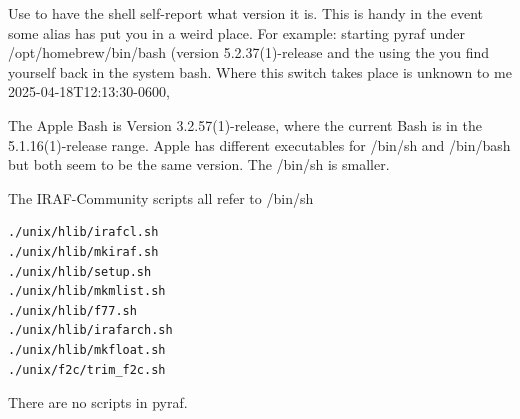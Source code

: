 Use  to have the shell self-report what version
it is. This is handy in the event some alias has put you in a weird place.
For example: starting pyraf under /opt/homebrew/bin/bash (version 5.2.37(1)-release
and the using the  you find yourself back in
the system bash. Where this switch takes place is unknown to me 2025-04-18T12:13:30-0600,



The Apple Bash is Version 3.2.57(1)-release, where the current Bash is in the 
5.1.16(1)-release range. Apple has different executables for /bin/sh and /bin/bash
but both seem to be the same version. The /bin/sh is smaller.

The IRAF-Community scripts all refer to /bin/sh
\begingroup \fontsize{10pt}{10pt}
\selectfont
\begin{verbatim} 
./unix/hlib/irafcl.sh
./unix/hlib/mkiraf.sh
./unix/hlib/setup.sh
./unix/hlib/mkmlist.sh
./unix/hlib/f77.sh
./unix/hlib/irafarch.sh
./unix/hlib/mkfloat.sh
./unix/f2c/trim_f2c.sh
\end{verbatim}
\endgroup

There are no scripts in pyraf.


